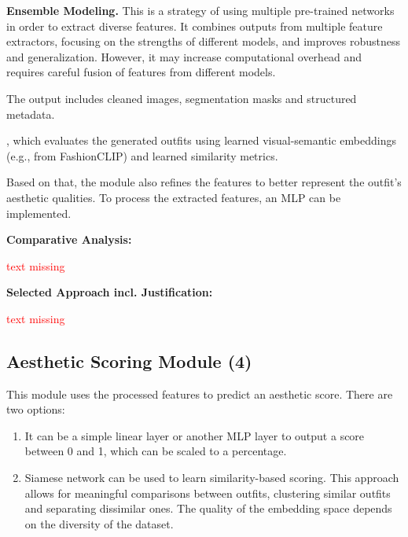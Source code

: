 \vspace{0.5cm}

\textbf{Ensemble Modeling.}
This is a strategy of using multiple pre-trained networks in order to extract diverse features. It combines outputs from multiple feature extractors, focusing on the strengths of different models, and improves robustness and generalization. However, it may increase computational overhead and requires careful fusion of features from different models.

The output includes cleaned images, segmentation masks and structured metadata.


, which evaluates the generated outfits using learned visual-semantic embeddings (e.g., from FashionCLIP) and learned similarity metrics.



Based on that, the module also refines the features to better represent the outfit's aesthetic qualities. To process the extracted features, an \acs{MLP} can be implemented.

\vspace{0.5cm}

\textbf{Comparative Analysis:}

\vspace{0.5cm}

\textcolor{red}{text missing}

\vspace{0.5cm}

\textbf{Selected Approach incl. Justification:}

\vspace{0.5cm}

\textcolor{red}{text missing}

\subsection{Aesthetic Scoring Module (4)}

This module uses the processed features to predict an aesthetic score. There are two options:

\begin{enumerate}
   \item It can be a simple linear layer or another \acs{MLP} layer to output a score between 0 and 1, which can be scaled to a percentage.
   \item Siamese network can be used to learn similarity-based scoring. This approach allows for meaningful comparisons between outfits, clustering similar outfits and separating dissimilar ones. The quality of the embedding space depends on the diversity of the dataset.
\end{enumerate}

